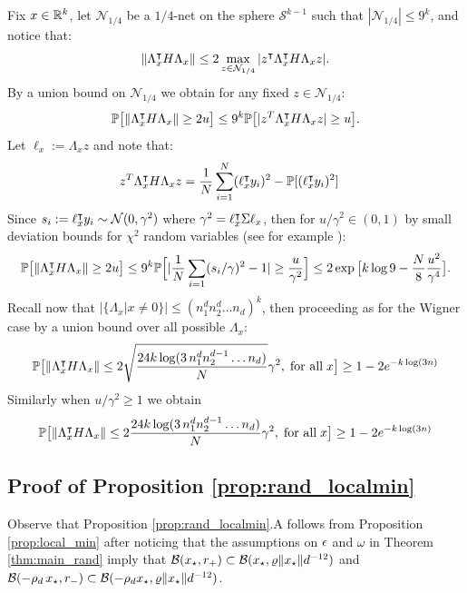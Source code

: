 Fix $x \in \mathbb{R}^k$, let $\mathcal{N}_{{1}/{4}}$ be a $1/4$-net on the sphere $\mathcal{S}^{k-1}$ such that $|\mathcal{N}_{1/4}| \leq 9^k$, and notice that:
\[
\|\Lambda_x^\intercal H \Lambda_x \| \leq 2 \max_{z \in \mathcal{N}_{{1}/{4}}} |z^\intercal \Lambda_x^\intercal H \Lambda_x   z|.
\]
By a union bound on $\mathcal{N}_{1/4}$ we obtain for any fixed $z \in \mathcal{N}_{{1}/{4}}$:
\[
\mathbb{P}\big[\|\Lambda_x^\intercal H \Lambda_x\| \geq 2 u \big] \leq 9^k \mathbb{P}\big[|z^T \Lambda_x^\intercal H \Lambda_x z | \geq u\big].
\]
Let $\ell_x := \Lambda_x z$ and note that:
\[
\begin{aligned}
z^T \Lambda_x^\T H \Lambda_x z &= \frac{1}{N} \sum_{i=1}^N (\ell_{x}^\T y_i)^2 - \EX[(\ell_{x}^\T y_i)^2 ]  %
\end{aligned}
\]
Since $s_i := \ell_{x}^\intercal y_i \sim \mathcal{N}(0,\gamma^2)$ where $\gamma^2 = \ell_{x}^\intercal \Sigma \ell_{x}$, then
for $u/\gamma^2 \in (0,1)$ by small deviation bounds for $\chi^2$ random variables (see for example \cite[Example 2.11]{wainwright2019high}): 
\[ 
\begin{aligned}
\mathbb{P}\big[\|\Lambda_x^\intercal H \Lambda_x\| \geq 2 u \big] \leq 9^k \mathbb{P}\Big[|\frac{1}{N}\sum_{i=1} ({s_i}/{\gamma})^2 - 1| \geq \frac{u}{\gamma^2}\Big]  
\leq 2 \exp\big[ k \log 9 - \frac{N}{8}\frac{u^2}{\gamma^4} \big].
\end{aligned}
\]
Recall now that $|\{\Lambda_x | x \neq 0 \}| \leq (n_1^d n_2^d \dots n_d )^k$, then
proceeding as for the Wigner case by a union bound over all possible $\Lambda_x$:
\[
\mathbb{P}\big[ \| \Lambda_x^\intercal H \Lambda_x \| \leq 2 \sqrt{\frac{24 k \log (3\, n_1^d n_2^{d-1} \dots n_d) }{N}} \gamma^2, \;\text{for all}\; x  \big] \geq 1 - 2 e^{- k \log(3 n)} 
\]
Similarly when $u/\gamma^2 \geq 1$ we obtain 
\[
\mathbb{P}\big[ \| \Lambda_x^\intercal H \Lambda_x \| \leq 2 {\frac{24 k \log (3\, n_1^d n_2^{d-1} \dots n_d) }{N}} \gamma^2, \;\text{for all}\; x  \big] \geq 1 - 2 e^{- k \log(3 n)} 
\]
\subsection{Proof of Proposition \ref{prop:rand_localmin}}\label{sec:min_rand}

Observe that Proposition \ref{prop:rand_localmin}.A follows from Proposition \ref{prop:local_min} after noticing that the assumptions on $\epsilon$ and $\omega$ in Theorem \ref{thm:main_rand} imply that $ \mathcal{B}({x_{\star}}, r_+) \subset \mathcal{B}({x_{\star}}, \varrho \|{x_{\star}}\| d^{-12})$ and $\mathcal{B}(- \rho_d \, {x_{\star}}, r_-) \subset  \mathcal{B}(-\rho_d {x_{\star}}, \varrho \|{x_{\star}}\| d^{-12})$. 

